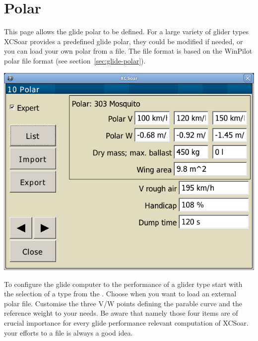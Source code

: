 \clearpage
\section{Polar}

This page allows the glide polar to be defined. For a large variety of glider types 
XCSoar provides a predefined glide polar, they could be modified if needed, or 
you can load your own polar from a file. 
The file format is based on the WinPilot polar file format (see section~\ref{sec:glide-polar}).

\begin{center}
\includegraphics[angle=0,width=0.8\linewidth,keepaspectratio='true']{figures/config-polar.png}
\end{center}

\label{conf:polar} To configure the glide computer to the performance of a glider 
type start with the selection of a type from the . 
Choose  when you want to load an external polar file.
Customise the three V/W points defining the parable curve and the reference 
weight to your needs. 
\tip Be aware that namely those four items are of crucial importance 
for every glide performance relevant computation of XCSoar.   
 your efforts to a file is always a good idea.


